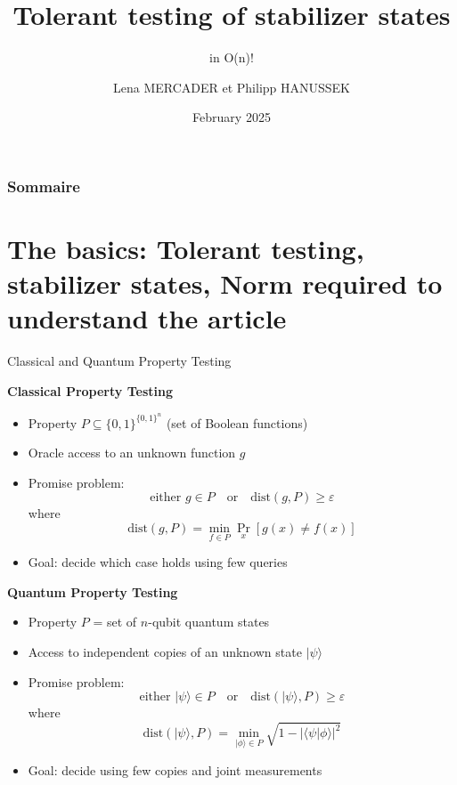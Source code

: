 \documentclass[9pt]{beamer}
\title{Tolerant testing of stabilizer states}
\subtitle{in O(n)!}
\date[2019]{February 2025}
\author[Euclid]{Lena MERCADER et Philipp HANUSSEK}
\institute{Quantum Information Master 2 (QI)}
\begin{document}
\begin{frame}[plain]
\titlepage
\end{frame}

\begin{frame}
        \frametitle{Sommaire}
        \tableofcontents
\end{frame}

\section{The basics: Tolerant testing, stabilizer states, Norm required to understand the article}

\begin{frame}{Classical and Quantum Property Testing}

\textbf{Classical Property Testing}

\begin{itemize}
    \item Property $P \subseteq \{0,1\}^{\{0,1\}^n}$ (set of Boolean functions)
    \item Oracle access to an unknown function $g$
    \item Promise problem:
    \[
        \text{either } g \in P
        \quad \text{or} \quad
        \mathrm{dist}(g,P) \ge \varepsilon
    \]
    where
    \[
        \mathrm{dist}(g,P)
        =
        \min_{f \in P} \Pr_x[g(x)\neq f(x)]
    \]
    \item Goal: decide which case holds using few queries
\end{itemize}

\vspace{0.3cm}

\textbf{Quantum Property Testing}

\begin{itemize}
    \item Property $P$ = set of $n$-qubit quantum states
    \item Access to independent copies of an unknown state $|\psi\rangle$
    \item Promise problem:
    \[
        \text{either } |\psi\rangle \in P
        \quad \text{or} \quad
        \mathrm{dist}(|\psi\rangle,P) \ge \varepsilon
    \]
    where
    \[
        \mathrm{dist}(|\psi\rangle,P)
        =
        \min_{|\phi\rangle \in P}
        \sqrt{1 - |\langle \psi | \phi \rangle|^2}
    \]
    \item Goal: decide using few copies and joint measurements
\end{itemize}


\end{frame}
\end{document}

